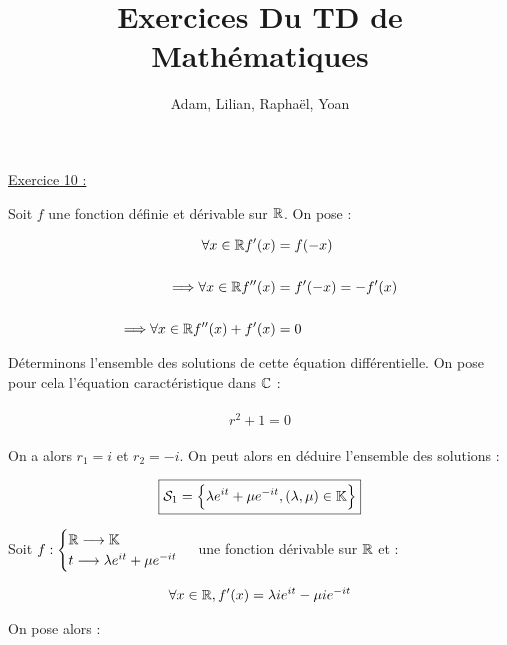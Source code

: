 \documentclass{article}
\title{Exercices Du TD de Mathématiques}
\author{Adam, Lilian, Raphaël, Yoan}
\begin{document}
\maketitle

\underline{Exercice 10 :}

Soit $f$ une fonction définie et dérivable sur $\mathbb{R}$. On pose :

\begin{align}\begin{split}
\forall x\in\mathbb{R} f'(x)&=f(-x)\\\\
\Longrightarrow \forall x\in\mathbb{R} f''(x)&=f'(-x)=-f'(x)\\\\
\Longrightarrow \forall x\in\mathbb{R} f''(x)+f'(x)&=0
\end{split}\end{align}

Déterminons l'ensemble des solutions de cette équation différentielle. On pose pour cela l'équation caractéristique dans $\mathbb{C}$ :

\begin{align*}\begin{split}
r^2+1=0
\end{split}\end{align*}

On a alors $r_1=i$ et $r_2=-i$. On peut alors en déduire l'ensemble des solutions :

\begin{align*}\begin{split}
\boxed{\mathcal{S}_1=\Bigl\{\lambda e^{it}+\mu e^{-it}, (\lambda,\mu)\in\mathbb{K} \Bigl\}}
\end{split}\end{align*}

\bigskip
\bigskip
\bigskip

Soit $f:\begin{cases}\mathbb{R}\longrightarrow\mathbb{K} \\ t\longrightarrow \lambda e^{it} + \mu e^{-it}\end{cases}$ une fonction dérivable sur $\mathbb{R}$ et :

\begin{align*}\begin{split}
\forall x\in\mathbb{R}, f'(x)=\lambda ie^{it}-\mu ie^{-it}\\
\end{split}\end{align*}

On pose alors :
\end{document}
